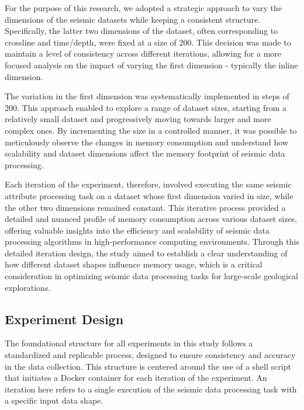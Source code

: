 For the purpose of this research, we adopted a strategic approach to vary the dimensions of the seismic datasets while keeping a consistent structure.
Specifically, the latter two dimensions of the dataset, often corresponding to crossline and time/depth, were fixed at a size of 200.
This decision was made to maintain a level of consistency across different iterations, allowing for a more focused analysis on the impact of varying the first dimension - typically the inline dimension.

The variation in the first dimension was systematically implemented in steps of 200.
This approach enabled to explore a range of dataset sizes, starting from a relatively small dataset and progressively moving towards larger and more complex ones.
By incrementing the size in a controlled manner, it was possible to meticulously observe the changes in memory consumption and understand how scalability and dataset dimensions affect the memory footprint of seismic data processing.

Each iteration of the experiment, therefore, involved executing the same seismic attribute processing task on a dataset whose first dimension varied in size, while the other two dimensions remained constant.
This iterative process provided a detailed and nuanced profile of memory consumption across various dataset sizes, offering valuable insights into the efficiency and scalability of seismic data processing algorithms in high-performance computing environments.
Through this detailed iteration design, the study aimed to establish a clear understanding of how different dataset shapes influence memory usage, which is a critical consideration in optimizing seismic data processing tasks for large-scale geological explorations.


\subsection{Experiment Design}

The foundational structure for all experiments in this study follows a standardized and replicable process, designed to ensure consistency and accuracy in the data collection.
This structure is centered around the use of a shell script that initiates a Docker container for each iteration of the experiment.
An iteration here refers to a single execution of the seismic data processing task with a specific input data shape.

